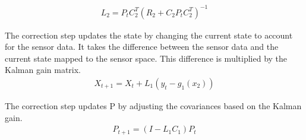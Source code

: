 \documentclass{article}
\begin{document}
\begin{align}
	L_2 = P_tC_2^T(R_2 + C_2P_tC_2^T)^{-1}
\end{align}

The correction step updates the state by changing the current state to account for the sensor data. It takes the difference between the sensor data and the current state mapped to the sensor space. This difference is multiplied by the Kalman gain matrix.
\begin{align}
	X_{t+1} = X_t + L_1(y_t-g_1(x_2))
\end{align}

The correction step updates P by adjusting the covariances based on the Kalman gain.
\begin{align}
	P_{t+1} = (I-L_1C_1)P_t
\end{align}
\end{document}
